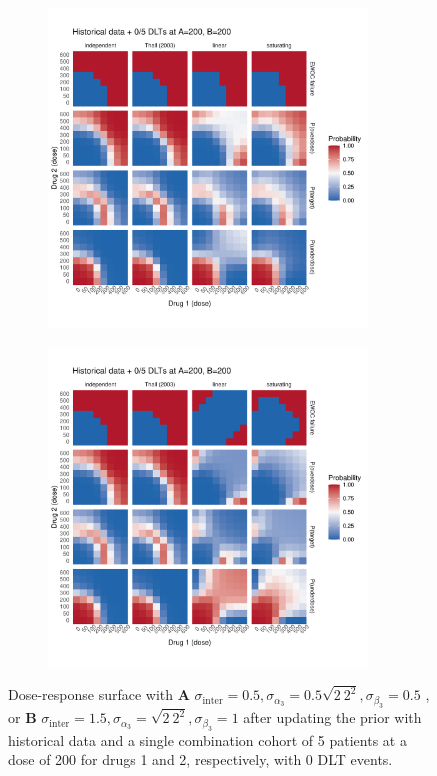 \documentclass[AMA,STIX1COL]{WileyNJD-v2}
\begin{document}
\begin{figure}
\centering
{
\begin{subfigure}[t]{.45\linewidth}
\caption{}
{\includegraphics[width=240pt]{figures/ggplot_mu_sd_inter_0_5_Historical_data_+_0_5_DLTs_at_A=200_B=200.pdf}}
\end{subfigure}
\hspace{1mm}
\begin{subfigure}[t]{.45\linewidth}
\caption{}
{\includegraphics[width=240pt]{figures/ggplot_mu_sd_inter_1_5_Historical_data_+_0_5_DLTs_at_A=200_B=200.pdf}}
\end{subfigure}
}
\caption{Dose-response surface with \textbf{A} $\sigma_\text{inter} = 0.5,\sigma_{\alpha_3} = 0.5 \sqrt{2~2^2}, \sigma_{\beta_3} = 0.5$
, or \textbf{B} $\sigma_\text{inter} = 1.5, \sigma_{\alpha_3} = \sqrt{2~2^2}, \sigma_{\beta_3} = 1$ after updating the prior with historical data and a single combination cohort of 5 patients at a dose of 200 for drugs 1 and 2, respectively, with 0 DLT events.}
\label{fig:prior_histdata_0_5}
\end{figure}
\end{document}
